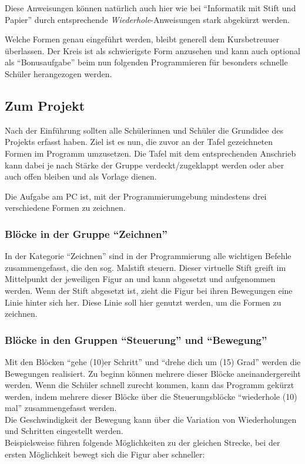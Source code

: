 Diese Anweisungen können natürlich auch hier wie bei ``Informatik mit
Stift und Papier'' durch entsprechende \emph{Wiederhole}-Anweisungen
stark abgekürzt werden.

Welche Formen genau eingeführt werden, bleibt generell dem Kursbetreuuer
überlassen. Der Kreis ist als schwierigste Form anzusehen und kann auch
optional als ``Bonusaufgabe'' beim nun folgenden Programmieren für
besonders schnelle Schüler herangezogen werden.

\subsection{Zum Projekt}\label{zum-projekt}

Nach der Einführung sollten alle Schülerinnen und Schüler die Grundidee
des Projekts erfasst haben. Ziel ist es nun, die zuvor an der Tafel
gezeichneten Formen im Programm umzusetzen. Die Tafel mit dem
entsprechenden Anschrieb kann dabei je nach Stärke der Gruppe
verdeckt/zugeklappt werden oder aber auch offen bleiben und als Vorlage
dienen.

Die Aufgabe am PC ist, mit der Programmierumgebung mindestens drei
verschiedene Formen zu zeichnen.

\subsubsection{\texorpdfstring{Blöcke in der Gruppe
``Zeichnen''}{Blöcke in der Gruppe Zeichnen}}\label{bluxf6cke-in-der-gruppe-zeichnen}

In der Kategorie ``Zeichnen'' sind in der Programmierung alle wichtigen
Befehle zusammengefasst, die den sog. Malstift steuern. Dieser virtuelle
Stift greift im Mittelpunkt der jeweiligen Figur an und kann abgesetzt
und aufgenommen werden. Wenn der Stift abgesetzt ist, zieht die Figur
bei ihren Bewegungen eine Linie hinter sich her. Diese Linie soll hier
genutzt werden, um die Formen zu zeichnen.

\subsubsection{\texorpdfstring{Blöcke in den Gruppen ``Steuerung'' und
``Bewegung''}{Blöcke in den Gruppen Steuerung und Bewegung}}\label{bluxf6cke-in-den-gruppen-steuerung-und-bewegung}

Mit den Blöcken ``gehe (10)er Schritt'' und ``drehe dich um (15) Grad''
werden die Bewegungen realisiert. Zu beginn können mehrere dieser Blöcke
aneinandergereiht werden. Wenn die Schüler schnell zurecht kommen, kann
das Programm gekürzt werden, indem mehrere dieser Blöcke über die
Steuerungsblöcke ``wiederhole (10) mal'' zusammengefasst werden.\\
Die Geschwindigkeit der Bewegung kann über die Variation von
Wiederholungen und Schritten eingestellt werden.\\
Beispielsweise führen folgende Möglichkeiten zu der gleichen Strecke,
bei der ersten Möglichkeit bewegt sich die Figur aber schneller:


